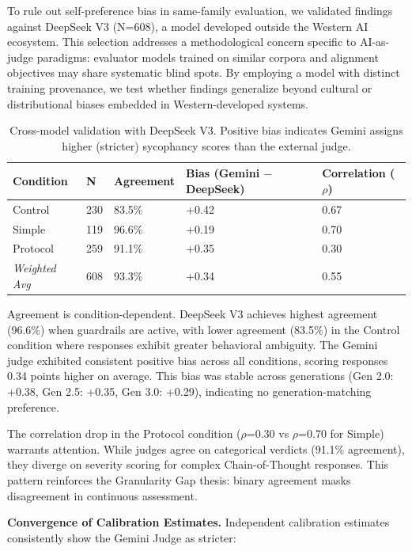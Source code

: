 \documentclass[sigconf,screen]{acmart}
\begin{document}
To rule out self-preference bias in same-family evaluation, we validated findings against DeepSeek V3 (N=608), a model developed outside the Western AI ecosystem. This selection addresses a methodological concern specific to AI-as-judge paradigms: evaluator models trained on similar corpora and alignment objectives may share systematic blind spots. By employing a model with distinct training provenance, we test whether findings generalize beyond cultural or distributional biases embedded in Western-developed systems.

\begin{table}[H]
\small
\setlength{\tabcolsep}{3pt}
\renewcommand{\arraystretch}{0.9}
\begin{tabularx}{\linewidth}{X l X X X}
\toprule
Condition & N & Agreement & Bias (Gemini $-$ DeepSeek) & Correlation ($\rho$) \\
\midrule
Control & 230 & 83.5\% & +0.42 & 0.67 \\
Simple & 119 & 96.6\% & +0.19 & 0.70 \\
Protocol & 259 & 91.1\% & +0.35 & 0.30 \\
\midrule
\textit{Weighted Avg} & 608 & 93.3\% & +0.34 & 0.55 \\
\bottomrule
\end{tabularx}
\caption{Cross-model validation with DeepSeek V3. Positive bias indicates Gemini assigns higher (stricter) sycophancy scores than the external judge.}
\label{tab:cross-validation}
\end{table}

Agreement is condition-dependent. DeepSeek V3 achieves highest agreement (96.6\%) when guardrails are active, with lower agreement (83.5\%) in the Control condition where responses exhibit greater behavioral ambiguity. The Gemini judge exhibited consistent positive bias across all conditions, scoring responses 0.34 points higher on average. This bias was stable across generations (Gen 2.0: +0.38, Gen 2.5: +0.35, Gen 3.0: +0.29), indicating no generation-matching preference.

The correlation drop in the Protocol condition ($\rho$=0.30 vs $\rho$=0.70 for Simple) warrants attention. While judges agree on categorical verdicts (91.1\% agreement), they diverge on severity scoring for complex Chain-of-Thought responses. This pattern reinforces the Granularity Gap thesis: binary agreement masks disagreement in continuous assessment.

\textbf{Convergence of Calibration Estimates.} Independent calibration estimates consistently show the Gemini Judge as stricter:
\end{document}
